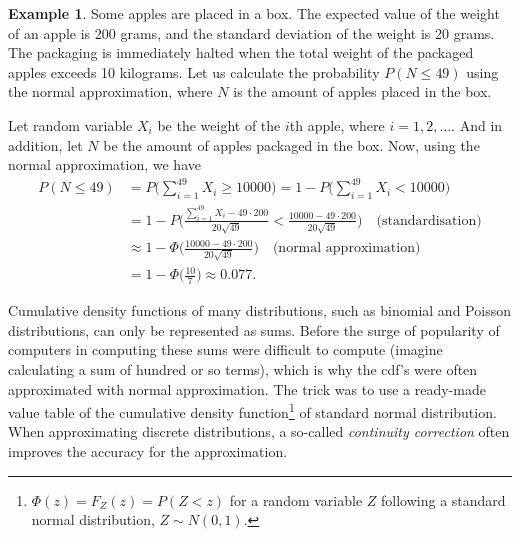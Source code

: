 \documentclass[12pt,a4paper,leqno]{report}
\theoremstyle{plain}
\theoremstyle{definition}
\newtheorem{esim}[equation]{Example}
\begin{document}
\begin{esim}
Some apples are placed in a box. The expected value of the weight of an apple is 200 grams, and the standard deviation of the weight is 20 grams. The packaging is immediately halted when the total weight of the packaged apples exceeds 10 kilograms. Let us calculate the probability $P(N \leq 49)$ using the normal approximation, where $N$ is the amount of apples placed in the box.

Let random variable $X_i$ be the weight of the $i$th apple, where $i = 1,2, \ldots$. And in addition, let $N$ be the amount of apples packaged in the box. Now, using the normal approximation, we have
\[
\begin{split}
P(N \leq 49) &= P\Big(\sum_{i = 1}^{49}X_i \geq 10000 \Big) = 1 - P\Big(\sum_{i = 1}^{49}X_i < 10000 \Big) \\
&= 1 - P\Big(\frac{\sum_{i = 1}^{49}X_i-49 \cdot 200}{20\sqrt{49}} < \frac{10000 - 49 \cdot 200}{20\sqrt{49}} \Big) \quad \text{(standardisation)} \\
&\approx 1 - \Phi \big( \frac{10000- 49 \cdot 200}{20 \sqrt{49}} \big) \quad \text{(normal approximation)} \\
&= 1 - \Phi\big( \frac{10}{7} \big) \approx 0.077.
\end{split}
\]
\end{esim}

Cumulative density functions of many distributions, such as binomial and Poisson distributions, can only be represented as sums. Before the surge of popularity of computers in computing these sums were difficult to compute (imagine calculating a sum of hundred or so terms), which is why the cdf's were often approximated with normal approximation. The trick was to use a ready-made value table of the cumulative density function\footnote{$\Phi(z) = F_Z(z) = P(Z < z)$ for a random variable $Z$ following a standard normal distribution, $Z \sim N(0,1)$.} of standard normal distribution. When approximating discrete distributions, a so-called \emph{continuity correction} often improves the accuracy for the approximation.
\end{document}
